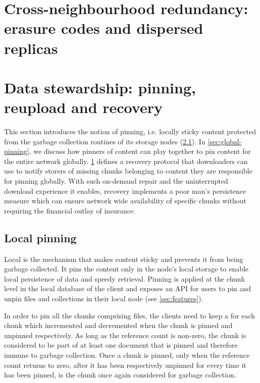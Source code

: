 


\section{Cross-neighbourhood redundancy: erasure codes and dispersed replicas \statusgreen}\label{sec:erasure}
\green{}




\section{Data stewardship: pinning, reupload and recovery \statusyellow}\label{sec:reupload}

This section introduces the notion of pinning, i.e. locally sticky content protected from the garbage collection routines of its storage nodes (\ref{sec:pinning}). In \ref{sec:global-pinning}, we discuss how pinners of content can play together to pin content for the entire network globally. \ref{sec:erasure} defines a recovery protocol that downloaders can use to notify storers of missing chunks belonging to content they are responsible for pinning globally. With such on-demand repair and the uninterrupted download experience it enables, recovery implements a poor man's persistence measure which can ensure network wide availability of specific chunks without requiring the financial outlay of insurance.

\subsection{Local pinning \statusgreen}\label{sec:pinning}

Local  is the mechanism that makes content sticky and prevents it from being garbage collected. It pins the content only in the node's local storage to enable local persistence of data and speedy retrieval. Pinning is applied at the chunk level in the local database of the client and exposes an API for users to pin and unpin files and collections in their local node (see \ref{sec:features}).

In order to pin all the chunks comprising files, the clients need to keep a  for each chunk which incremented and decremented when the chunk is pinned and unpinned respectively. As long as the reference count is non-zero, the chunk is considered to be part of at least one document that is pinned and therefore immune to garbage collection. Once a chunk is pinned, only when the reference count returns to zero, after it has been respectively unpinned for every time it has been pinned, is the chunk once again considered for garbage collection.

